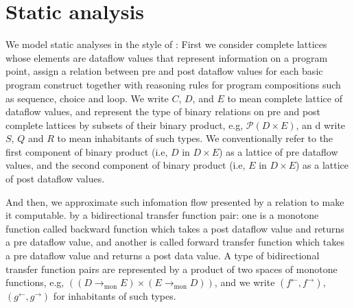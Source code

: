 \documentclass{easychair}
\theoremstyle{definition}
\newcommand{\Pow}{\mathcal{P}}
\newcommand{\tomon}{\to_{\mathrm{mon}}}
\newcommand{\ff}{{f^{\rightarrow}}}
\newcommand{\fb}{{f^{\leftarrow}}}
\newcommand{\gf}{{g^{\rightarrow}}}
\newcommand{\gb}{{g^{\leftarrow}}}
\begin{document}
\section{Static analysis}
We model static analyses in the style of \cite{frade_bidirectional_2009}: First we consider
complete lattices whose elements are dataflow values that represent
information on a program point, assign a relation between pre and post
dataflow values for each basic program construct together with reasoning
rules for program compositions such as sequence, choice and loop. We
write $C$, $D$, and $E$ to mean complete lattice of dataflow values, and
represent the type of binary relations on pre and post complete lattices
by subsets of their binary product, e.g, $\Pow(D \times E)$, an d write $S$,
$Q$ and $R$ to mean inhabitants of such types. We conventionally refer
to the first component of binary product (i.e, $D$ in $D \times E$) as a
lattice of pre dataflow values, and the second component of binary
product (i.e, $E$ in $D \times E$) as a lattice of post dataflow values.

And then, we approximate such infomation flow presented by a relation to make it computable.
by a bidirectional transfer function pair: one is a monotone function
called backward function which takes a post dataflow value and returns a
pre dataflow value, and another is called forward transfer function
which takes a pre dataflow value and returns a post data value. A type
of bidirectional transfer function pairs are represented by a product of
two spaces of monotone functions, e.g, $((D \tomon E) \times (E \tomon D))$,
and we write $(\fb, \ff)$, $(\gb , \gf)$ for inhabitants of such types.
\end{document}
